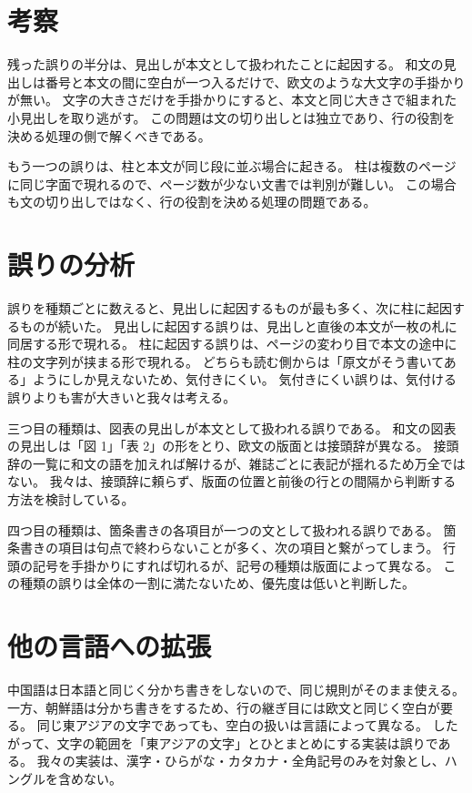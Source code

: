 \documentclass[11pt,a4paper]{article}
\newcommand{\s}[1]{#1}
\begin{document}
\section{考察}

\s{残った誤りの半分は、見出しが本文として扱われたことに起因する。}%
\s{和文の見出しは番号と本文の間に空白が一つ入るだけで、欧文のような大文字の手掛かりが無い。}%
\s{文字の大きさだけを手掛かりにすると、本文と同じ大きさで組まれた小見出しを取り逃がす。}%
\s{この問題は文の切り出しとは独立であり、行の役割を決める処理の側で解くべきである。}%

\s{もう一つの誤りは、柱と本文が同じ段に並ぶ場合に起きる。}%
\s{柱は複数のページに同じ字面で現れるので、ページ数が少ない文書では判別が難しい。}%
\s{この場合も文の切り出しではなく、行の役割を決める処理の問題である。}%

\section{誤りの分析}

\s{誤りを種類ごとに数えると、見出しに起因するものが最も多く、次に柱に起因するものが続いた。}%
\s{見出しに起因する誤りは、見出しと直後の本文が一枚の札に同居する形で現れる。}%
\s{柱に起因する誤りは、ページの変わり目で本文の途中に柱の文字列が挟まる形で現れる。}%
\s{どちらも読む側からは「原文がそう書いてある」ようにしか見えないため、気付きにくい。}%
\s{気付きにくい誤りは、気付ける誤りよりも害が大きいと我々は考える。}%

\s{三つ目の種類は、図表の見出しが本文として扱われる誤りである。}%
\s{和文の図表の見出しは「図 1」「表 2」の形をとり、欧文の版面とは接頭辞が異なる。}%
\s{接頭辞の一覧に和文の語を加えれば解けるが、雑誌ごとに表記が揺れるため万全ではない。}%
\s{我々は、接頭辞に頼らず、版面の位置と前後の行との間隔から判断する方法を検討している。}%

\s{四つ目の種類は、箇条書きの各項目が一つの文として扱われる誤りである。}%
\s{箇条書きの項目は句点で終わらないことが多く、次の項目と繋がってしまう。}%
\s{行頭の記号を手掛かりにすれば切れるが、記号の種類は版面によって異なる。}%
\s{この種類の誤りは全体の一割に満たないため、優先度は低いと判断した。}%

\section{他の言語への拡張}

\s{中国語は日本語と同じく分かち書きをしないので、同じ規則がそのまま使える。}%
\s{一方、朝鮮語は分かち書きをするため、行の継ぎ目には欧文と同じく空白が要る。}%
\s{同じ東アジアの文字であっても、空白の扱いは言語によって異なる。}%
\s{したがって、文字の範囲を「東アジアの文字」とひとまとめにする実装は誤りである。}%
\s{我々の実装は、漢字・ひらがな・カタカナ・全角記号のみを対象とし、ハングルを含めない。}%
\end{document}
